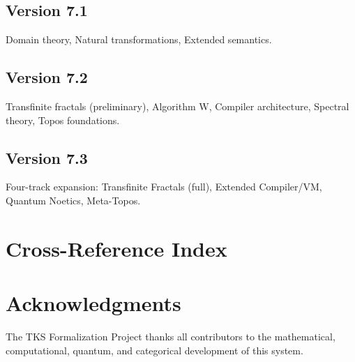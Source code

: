 \documentclass[11pt,twoside,openright]{book}
\theoremstyle{definition}
\theoremstyle{plain}
\theoremstyle{remark}
\begin{document}
\section{Version 7.1}
Domain theory, Natural transformations, Extended semantics.

\section{Version 7.2}
Transfinite fractals (preliminary), Algorithm W, Compiler architecture, Spectral theory, Topos foundations.

\section{Version 7.3}
Four-track expansion: Transfinite Fractals (full), Extended Compiler/VM, Quantum Noetics, Meta-Topos.

\chapter{Cross-Reference Index}
\label{ch:cross-reference}


\backmatter

\chapter*{Acknowledgments}

The TKS Formalization Project thanks all contributors to the mathematical, computational, quantum, and categorical development of this system.
\end{document}

